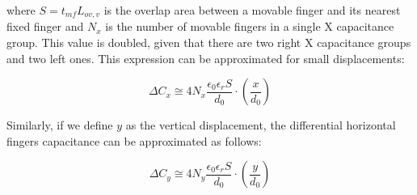 \documentclass[lettersize,journal]{IEEEtran}
\begin{document}
        where \(S=t_{mf}L_{ov,v}\) is the overlap area between a movable finger and its nearest fixed finger and \(N_x\) is the number of movable fingers in a single X capacitance group. This value is doubled, given that there are two right X capacitance groups and two left ones.
        This expression can be approximated for small displacements:
        
        \begin{equation}\label{eq:x_cap_approx}
            \Delta C_x \cong 4N_x\frac{\epsilon_{0}\epsilon_{r}S}{d_0}\cdot\left(\frac{x}{d_0}\right)
        \end{equation}
        
        Similarly, if we define \(y\) as the vertical displacement, the differential horizontal fingers capacitance can be approximated as follows:
        
        \begin{equation}\label{eq:y_cap_approx}
            \Delta C_y \cong 4N_y\frac{\epsilon_{0}\epsilon_{r}S}{d_0}\cdot\left(\frac{y}{d_0}\right)
        \end{equation}
        
        
    
\end{document}
